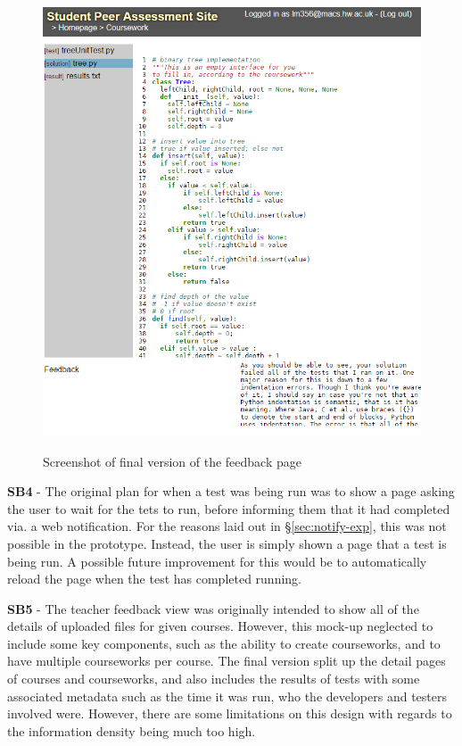\documentclass[a4paper,11pt]{report}
\begin{document}
\begin{figure}
\includegraphics[width=\textwidth]{storyboard/final-feedback.png}
\label{fig:final-fb}
\caption{Screenshot of final version of the feedback page}
\end{figure}
\textbf{SB4} - The original plan for when a test was being run was to show a page asking the user to wait for the tets to run, before informing them that it had completed via. a web notification. For the reasons laid out in \S \ref{sec:notify-exp}, this was not possible in the prototype. Instead, the user is simply shown a page that a test is being run. A possible future improvement for this would be to automatically reload the page when the test has completed running.\par
\textbf{SB5} - The teacher feedback view was originally intended to show all of the details of uploaded files for given courses. However, this mock-up neglected to include some key components, such as the ability to create courseworks, and to have multiple courseworks per course. The final version split up the detail pages of courses and courseworks, and also includes the results of tests with some associated metadata such as the time it was run, who the developers and testers involved were. However, there are some limitations on this design with regards to the information density being much too high.\par
\end{document}
